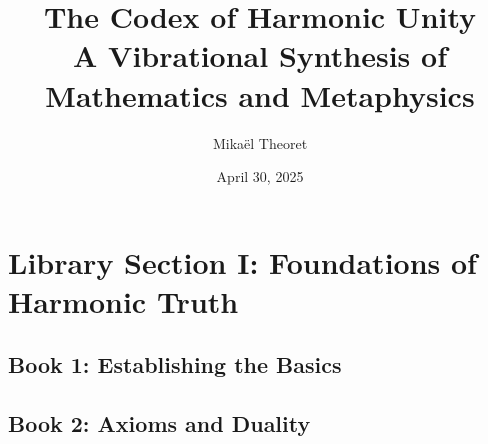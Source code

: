 \documentclass[a4paper,12pt]{book}
\title{
  \vspace{-1.5cm}
  \huge \textbf{The Codex of Harmonic Unity} \\
  \Large A Vibrational Synthesis of Mathematics and Metaphysics \\
  \vspace{0.5cm}
}
\author{Mikaël Theoret}
\date{April 30, 2025}
\begin{document}
\maketitle
\tableofcontents
\newpage

\part{Library Section I: Foundations of Harmonic Truth}

\chapter{Book 1: Establishing the Basics}






\chapter{Book 2: Axioms and Duality}






\end{document}
